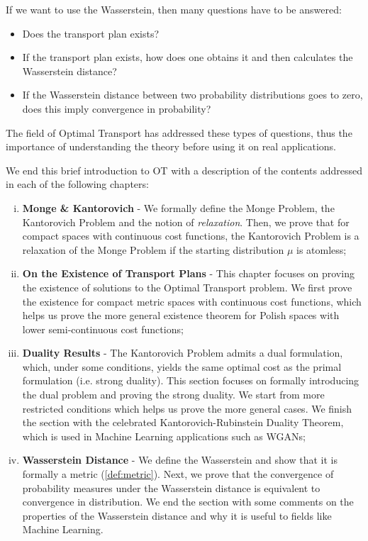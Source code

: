 If we want to use the Wasserstein, then many questions have to be answered:
\begin{itemize}
  \item Does the transport plan exists?
  \item If the transport plan exists, how does one obtains it and then calculates the Wasserstein distance?
  \item If the Wasserstein distance between two probability distributions goes to zero,
  does this imply convergence in probability?
\end{itemize}

The field of Optimal Transport has addressed these types of questions, thus the importance of understanding
the theory before using it on real applications.

We end this brief introduction to OT with a description of
the contents addressed in each of the following chapters:
\begin{enumerate}[(i)]
  \item \textbf{Monge \& Kantorovich} - We formally define the Monge Problem, the Kantorovich Problem
  and the notion of \textit{relaxation}. Then, we prove that for compact spaces with continuous cost functions,
  the Kantorovich Problem is a relaxation of the Monge Problem if the starting distribution $\mu$ is atomless;

  \item \textbf{On the Existence of Transport Plans} - This chapter focuses on
  proving the existence of solutions to the Optimal Transport problem.
  We first prove the existence for compact
  metric spaces with continuous cost functions, which helps us prove the more general
  existence theorem for Polish spaces with lower semi-continuous cost functions;
  
  \item \textbf{Duality Results} - The Kantorovich Problem
  admits a dual formulation, which, under some conditions, yields the same
  optimal cost as the primal formulation (i.e. strong duality). 
  This section focuses on formally introducing the dual problem and proving
  the strong duality. We start from more restricted conditions which helps us prove
  the more general cases. We finish the section with the celebrated Kantorovich-Rubinstein Duality
  Theorem, which is used in Machine Learning applications such as WGANs;

  \item \textbf{Wasserstein Distance} - We define the Wasserstein
  and show that it is formally a metric (\ref{def:metric}). Next, we prove that the convergence
  of probability measures under the Wasserstein distance is equivalent to convergence in distribution.
  We end the section with some comments on the properties of the Wasserstein distance and why
  it is useful to fields like Machine Learning.
\end{enumerate}

